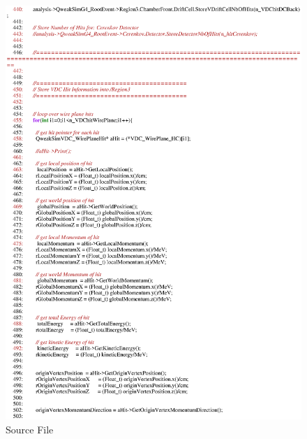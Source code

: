 \begin{figure}[h]
  \hspace{0cm}
  \includegraphics[scale=0.8]{./figures13/QweakSimEventAction.cc-p8.eps}
  \caption{Source File}
           \label{fig:XIII-SC-23}
\end{figure}

\clearpage

